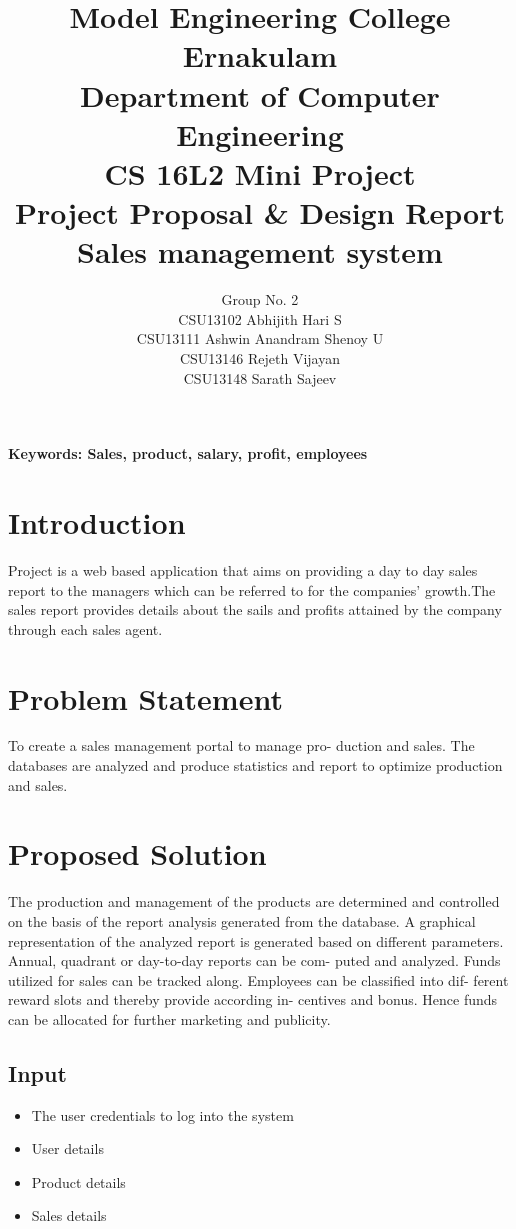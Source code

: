 \documentclass[twocolumn,10pt]{article}
\title{Model Engineering College Ernakulam
\\Department of Computer Engineering\\CS 16L2 Mini Project
\\ Project Proposal \& Design Report \\Sales management system\\}
\author{Group No. 2\\CSU13102 Abhijith Hari S\\CSU13111 Ashwin Anandram Shenoy U\\CSU13146 Rejeth Vijayan\\CSU13148 Sarath Sajeev\\}
\begin{document}
	
\maketitle
	
{\bf Keywords: Sales, product, salary, profit, employees}

\section{Introduction}
Project is a web based application that aims on providing a day to day sales report to the managers which can be referred to for the companies' growth.The sales report provides details about the sails and profits attained by the company through each sales agent.


\section{\label{reflabel}Problem Statement}
To create a sales management portal to manage pro-
duction and sales. The databases are analyzed and
produce statistics and report to optimize production
and sales.
\section{Proposed Solution}
The production and management of the products are
determined and controlled on the basis of the report
analysis generated from the database. A graphical
representation of the analyzed report is generated
based on different parameters.
Annual, quadrant or day-to-day reports can be com-
puted and analyzed. Funds utilized for sales can be
tracked along. Employees can be classified into dif-
ferent reward slots and thereby provide according in-
centives and bonus. Hence funds can be allocated for
further marketing and publicity.
\subsection{Input}
\begin{itemize}
   \item The user credentials to log into the system
   \item User details
   \item Product details
   \item Sales details
\end{itemize}
\end{document}
